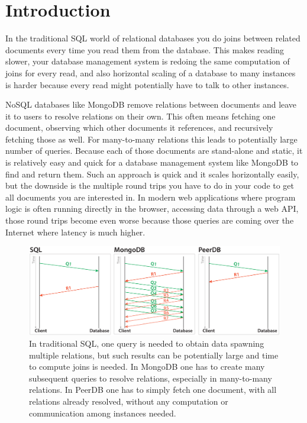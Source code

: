 \section{Introduction}

In the traditional SQL world of relational databases you do joins between related documents every time you read them from the database.
This makes reading slower, your database management system is redoing the same computation of joins for every read, and also horizontal scaling of a database to many instances is harder because every read might potentially have to talk to other instances.

NoSQL databases like MongoDB remove relations between documents and leave it to users to resolve relations on their own.
This often means fetching one document, observing which other documents it references, and recursively fetching those as well.
For many-to-many relations this leads to potentially large number of queries.
Because each of those documents are stand-alone and static, it is relatively easy and quick for a database management system like MongoDB to find and return them.
Such an approach is quick and it scales horizontally easily, but the downside is the multiple round trips you have to do in your code to get all documents you are interested in.
In modern web applications where program logic is often running directly in the browser, accessing data through a web API, those round trips become even worse because those queries are coming over the Internet where latency is much higher.

\begin{figure}[!h]
\centering
\includegraphics[width=0.9\columnwidth]{messages-many}
\caption{In traditional SQL, one query is needed to obtain data spawning multiple relations, but such results can be potentially large and time to compute joins is needed.
In MongoDB one has to create many subsequent queries to resolve relations, especially in many-to-many relations.
In PeerDB one has to simply fetch one document, with all relations already resolved, without any computation or communication among instances needed.}
\label{messages-many}
\end{figure}

